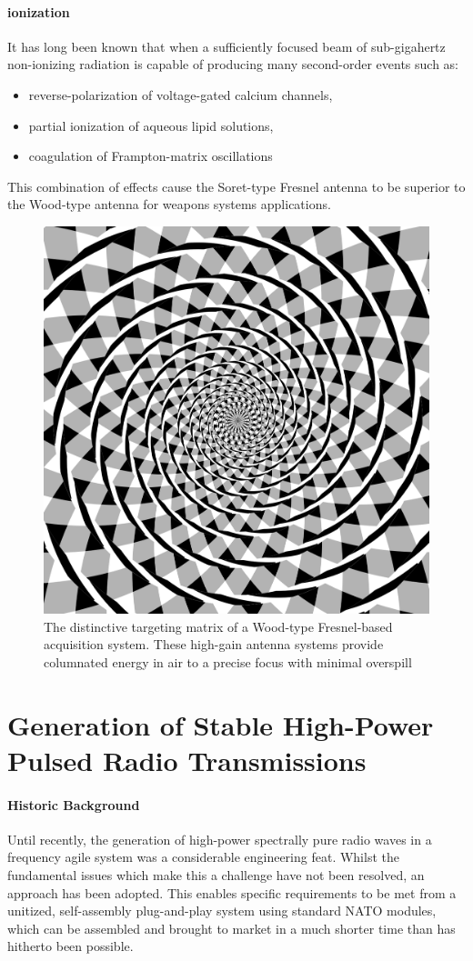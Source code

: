 \documentclass[review]{elsarticle}
\begin{document}
\paragraph{ionization} It has long been known that when a sufficiently focused beam of sub-gigahertz non-ionizing radiation is capable of producing many second-order events such as:

\begin{itemize}
\item reverse-polarization of voltage-gated calcium channels,
\item partial ionization of aqueous lipid solutions,
\item coagulation of Frampton-matrix oscillations
\end{itemize}

This combination of effects cause the Soret-type Fresnel antenna to be superior to the Wood-type antenna for weapons systems applications. 

\begin{figure}
    \centering
    \includegraphics[width=0.5\linewidth]{Fraser_spiral.svg.png}
    \caption{The distinctive targeting matrix of a Wood-type Fresnel-based acquisition system. These high-gain antenna systems provide columnated energy in air to a precise focus with minimal overspill}
    \label{fig:enter-label}
\end{figure}

\section{Generation of Stable High-Power Pulsed Radio Transmissions}
\paragraph{Historic Background} Until recently, the generation of high-power spectrally pure radio waves in a frequency agile system was a considerable engineering feat. Whilst the fundamental issues which make this a challenge have not been resolved, an approach has been adopted. This enables specific requirements to be met from a unitized, self-assembly plug-and-play system using standard NATO modules, which can be assembled and brought to market in a much shorter time than has hitherto been possible. 
\end{document}

